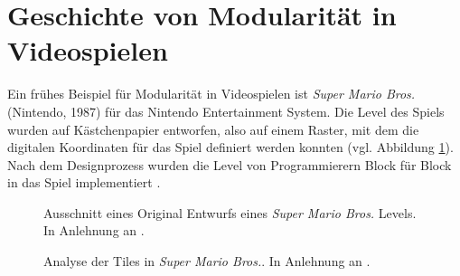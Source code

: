 \section{Geschichte von Modularität in Videospielen}\label{Geschichte von Modularität }
Ein frühes Beispiel für Modularität in Videospielen ist \textit{Super Mario Bros.} (Nintendo, 1987) für das Nintendo Entertainment System. Die Level des Spiels wurden auf Kästchenpapier entworfen, also auf einem Raster, mit dem die digitalen Koordinaten für das Spiel definiert werden konnten (vgl. Abbildung \ref{marioAnalog}). Nach dem Designprozess wurden die Level von Programmierern Block für Block in das Spiel implementiert \parencite{marioAnalog}.
\begin{figure}[H]
\centering
  \caption{Ausschnitt eines Original Entwurfs eines \textit{Super Mario Bros.} Levels. In Anlehnung an \parencite{marioAnalog}.}
\label{marioAnalog}
\end{figure}
\enlargethispage{10.5pt}
\begin{figure}[H]
\centering
  \caption{Analyse der Tiles in \textit{Super Mario Bros.}. In Anlehnung an \parencite{MarioTiles}.}
\label{MarioImage}
\end{figure}
\vspace{-10.5pt}
